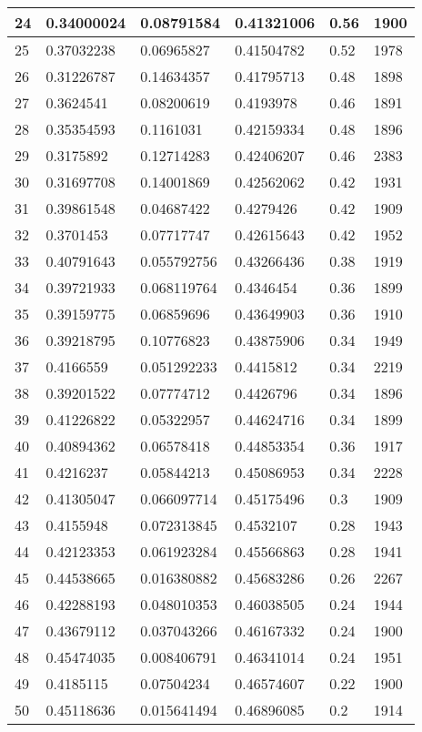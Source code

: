 \begin{longtable}{|l|l|l|l|l|l|}
24 & 0.34000024 & 0.08791584 & 0.41321006 & 0.56 & 1900 \\ \hline 
25 & 0.37032238 & 0.06965827 & 0.41504782 & 0.52 & 1978 \\ \hline 
26 & 0.31226787 & 0.14634357 & 0.41795713 & 0.48 & 1898 \\ \hline 
27 & 0.3624541 & 0.08200619 & 0.4193978 & 0.46 & 1891 \\ \hline 
28 & 0.35354593 & 0.1161031 & 0.42159334 & 0.48 & 1896 \\ \hline 
29 & 0.3175892 & 0.12714283 & 0.42406207 & 0.46 & 2383 \\ \hline 
30 & 0.31697708 & 0.14001869 & 0.42562062 & 0.42 & 1931 \\ \hline 
31 & 0.39861548 & 0.04687422 & 0.4279426 & 0.42 & 1909 \\ \hline 
32 & 0.3701453 & 0.07717747 & 0.42615643 & 0.42 & 1952 \\ \hline 
33 & 0.40791643 & 0.055792756 & 0.43266436 & 0.38 & 1919 \\ \hline 
34 & 0.39721933 & 0.068119764 & 0.4346454 & 0.36 & 1899 \\ \hline 
35 & 0.39159775 & 0.06859696 & 0.43649903 & 0.36 & 1910 \\ \hline 
36 & 0.39218795 & 0.10776823 & 0.43875906 & 0.34 & 1949 \\ \hline 
37 & 0.4166559 & 0.051292233 & 0.4415812 & 0.34 & 2219 \\ \hline 
38 & 0.39201522 & 0.07774712 & 0.4426796 & 0.34 & 1896 \\ \hline 
39 & 0.41226822 & 0.05322957 & 0.44624716 & 0.34 & 1899 \\ \hline 
40 & 0.40894362 & 0.06578418 & 0.44853354 & 0.36 & 1917 \\ \hline 
41 & 0.4216237 & 0.05844213 & 0.45086953 & 0.34 & 2228 \\ \hline 
42 & 0.41305047 & 0.066097714 & 0.45175496 & 0.3 & 1909 \\ \hline 
43 & 0.4155948 & 0.072313845 & 0.4532107 & 0.28 & 1943 \\ \hline 
44 & 0.42123353 & 0.061923284 & 0.45566863 & 0.28 & 1941 \\ \hline 
45 & 0.44538665 & 0.016380882 & 0.45683286 & 0.26 & 2267 \\ \hline 
46 & 0.42288193 & 0.048010353 & 0.46038505 & 0.24 & 1944 \\ \hline 
47 & 0.43679112 & 0.037043266 & 0.46167332 & 0.24 & 1900 \\ \hline 
48 & 0.45474035 & 0.008406791 & 0.46341014 & 0.24 & 1951 \\ \hline 
49 & 0.4185115 & 0.07504234 & 0.46574607 & 0.22 & 1900 \\ \hline 
50 & 0.45118636 & 0.015641494 & 0.46896085 & 0.2 & 1914 \\ \hline 
\end{longtable}